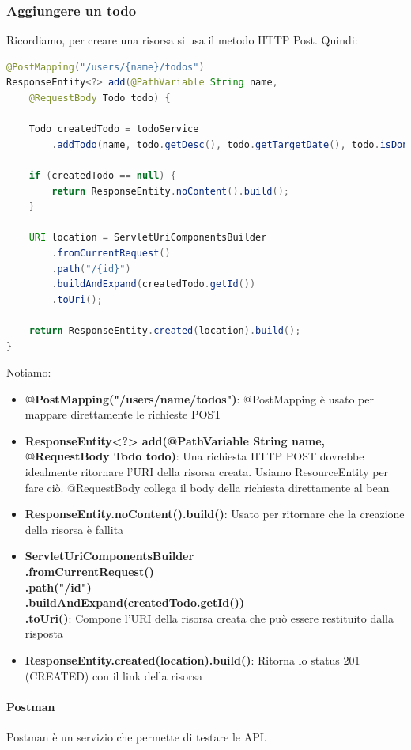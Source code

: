 \documentclass[11pt,a4paper]{book}
\begin{document}
\subsubsection{Aggiungere un todo}
Ricordiamo, per creare una risorsa si usa il metodo HTTP Post. Quindi:
\begin{lstlisting}[language = Java]
@PostMapping("/users/{name}/todos")
ResponseEntity<?> add(@PathVariable String name,
	@RequestBody Todo todo) {
	
	Todo createdTodo = todoService
		.addTodo(name, todo.getDesc(), todo.getTargetDate(), todo.isDone());
			
	if (createdTodo == null) {
		return ResponseEntity.noContent().build();
	}
	
	URI location = ServletUriComponentsBuilder
		.fromCurrentRequest()
		.path("/{id}")
		.buildAndExpand(createdTodo.getId())
		.toUri();
		
	return ResponseEntity.created(location).build();
}
\end{lstlisting}
Notiamo:
\begin{itemize}
	\item \textbf{@PostMapping("/users/{name}/todos")}: @PostMapping è usato per mappare direttamente le richieste POST
	\item \textbf{ResponseEntity<?> add(@PathVariable String name, @RequestBody
		Todo todo)}: Una richiesta HTTP POST dovrebbe idealmente ritornare l'URI della risorsa creata. Usiamo ResourceEntity per fare ciò. @RequestBody collega il body della richiesta direttamente al bean
	\item \textbf{ResponseEntity.noContent().build()}: Usato per ritornare che la creazione della risorsa è fallita	
	\item \textbf{ServletUriComponentsBuilder\\
		.fromCurrentRequest()\\
		.path("/{id}") \\
		.buildAndExpand(createdTodo.getId()) \\
		.toUri()}: Compone l'URI della risorsa creata che può essere restituito dalla risposta
	\item \textbf{ResponseEntity.created(location).build()}: Ritorna lo status 201 (CREATED) con il link della risorsa
\end{itemize}

\paragraph{Postman}
Postman è un servizio che permette di testare le API.
\end{document}
